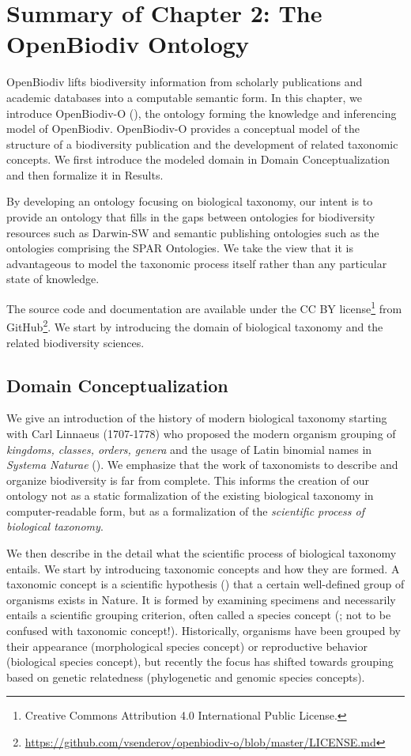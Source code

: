 \chapter{Summary of Chapter 2: The OpenBiodiv Ontology}

\label{chapter-ontology}

OpenBiodiv lifts biodiversity information from scholarly publications and academic databases into a computable semantic form.  In this chapter, we introduce OpenBiodiv-O (\cite{senderov_openbiodiv-o:_2018}), the ontology forming the knowledge and inferencing model of OpenBiodiv. OpenBiodiv-O provides a conceptual model of the structure of a biodiversity publication and the development of related taxonomic concepts. We first introduce the modeled domain in Domain Conceptualization and then formalize it in Results. 

By developing an ontology focusing on biological taxonomy, our intent is to provide an ontology that fills in the gaps between ontologies for biodiversity resources such as Darwin-SW and semantic publishing ontologies such as the ontologies comprising the SPAR Ontologies. We take the view that it is advantageous to model the taxonomic process itself rather than any particular state of knowledge.

The source code and documentation are available under the CC BY license\footnote{Creative Commons Attribution 4.0 International Public License.} from GitHub\footnote{\url{https://github.com/vsenderov/openbiodiv-o/blob/master/LICENSE.md}}. We start by introducing the domain of biological taxonomy and the related biodiversity sciences.

\section{Domain Conceptualization}
We give an introduction of the history of modern biological taxonomy starting with Carl Linnaeus (1707-1778) who proposed the modern organism grouping of \emph{kingdoms, classes, orders, genera} and the usage of Latin binomial names in \emph{Systema Naturae} (\cite{linnaeus_systema_1758}). We emphasize that the work of taxonomists to describe and organize biodiversity is far from complete. This informs the creation of our ontology not as a static formalization of the existing biological taxonomy in computer-readable form, but as a formalization of the \emph{scientific process of biological taxonomy}.

We then describe in the detail what the scientific process of biological taxonomy entails. We start by introducing taxonomic concepts and how they are formed. A taxonomic concept is a scientific hypothesis (\cite{deans_time_2012}) that a certain well-defined group of organisms exists in Nature. It is formed by examining specimens and necessarily entails a scientific grouping criterion, often called a species concept (\cite{mallet_species_2001}; not to be confused with taxonomic concept!). Historically, organisms have been grouped by their appearance (morphological species concept) or reproductive behavior (biological species concept), but recently the focus has shifted towards grouping based on genetic relatedness (phylogenetic and genomic species concepts).

